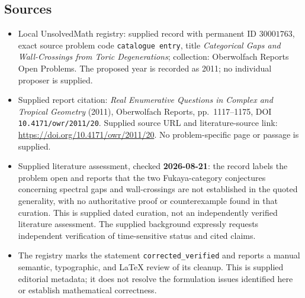 \documentclass[11pt]{article}
\begin{document}
\subsection{Sources}
\begin{itemize}
\item Local UnsolvedMath registry: supplied record with permanent ID \(30001763\), exact source problem code \texttt{catalogue entry}, title \emph{Categorical Gaps and Wall-Crossings from Toric Degenerations}; collection: Oberwolfach Reports Open Problems. The proposed year is recorded as 2011; no individual proposer is supplied.
\item Supplied report citation: \emph{Real Enumerative Questions in Complex and Tropical Geometry} (2011), Oberwolfach Reports, pp.\ 1117--1175, DOI \texttt{10.4171/owr/2011/20}. Supplied source URL and literature-source link: \url{https://doi.org/10.4171/owr/2011/20}. No problem-specific page or passage is supplied.
\item Supplied literature assessment, checked \textbf{2026-08-21}: the record labels the problem open and reports that the two Fukaya-category conjectures concerning spectral gaps and wall-crossings are not established in the quoted generality, with no authoritative proof or counterexample found in that curation. This is supplied dated curation, not an independently verified literature assessment. The supplied background expressly requests independent verification of time-sensitive status and cited claims.
\item The registry marks the statement \texttt{corrected\_verified} and reports a manual semantic, typographic, and LaTeX review of its cleanup. This is supplied editorial metadata; it does not resolve the formulation issues identified here or establish mathematical correctness.
\end{itemize}
\end{document}

